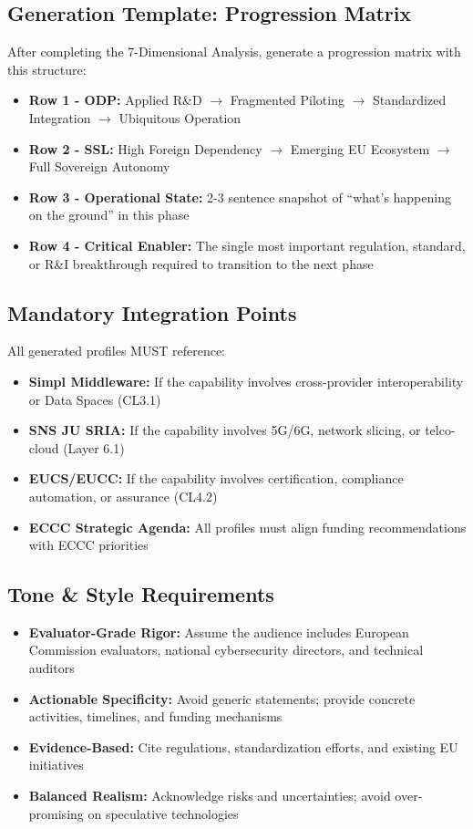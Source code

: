 \documentclass[12pt,a4paper]{article}
\begin{document}
\subsection*{Generation Template: Progression Matrix}
After completing the 7-Dimensional Analysis, generate a progression matrix with this structure:

\begin{itemize}
    \item \textbf{Row 1 - ODP:} Applied R\&D $\rightarrow$ Fragmented Piloting $\rightarrow$ Standardized Integration $\rightarrow$ Ubiquitous Operation
    \item \textbf{Row 2 - SSL:} High Foreign Dependency $\rightarrow$ Emerging EU Ecosystem $\rightarrow$ Full Sovereign Autonomy
    \item \textbf{Row 3 - Operational State:} 2-3 sentence snapshot of ``what's happening on the ground'' in this phase
    \item \textbf{Row 4 - Critical Enabler:} The single most important regulation, standard, or R\&I breakthrough required to transition to the next phase
\end{itemize}

\subsection*{Mandatory Integration Points}
All generated profiles MUST reference:
\begin{itemize}
    \item \textbf{Simpl Middleware:} If the capability involves cross-provider interoperability or Data Spaces (CL3.1)
    \item \textbf{SNS JU SRIA:} If the capability involves 5G/6G, network slicing, or telco-cloud (Layer 6.1)
    \item \textbf{EUCS/EUCC:} If the capability involves certification, compliance automation, or assurance (CL4.2)
    \item \textbf{ECCC Strategic Agenda:} All profiles must align funding recommendations with ECCC priorities
\end{itemize}

\subsection*{Tone \& Style Requirements}
\begin{itemize}
    \item \textbf{Evaluator-Grade Rigor:} Assume the audience includes European Commission evaluators, national cybersecurity directors, and technical auditors
    \item \textbf{Actionable Specificity:} Avoid generic statements; provide concrete activities, timelines, and funding mechanisms
    \item \textbf{Evidence-Based:} Cite regulations, standardization efforts, and existing EU initiatives
    \item \textbf{Balanced Realism:} Acknowledge risks and uncertainties; avoid over-promising on speculative technologies
\end{itemize}
\end{document}
